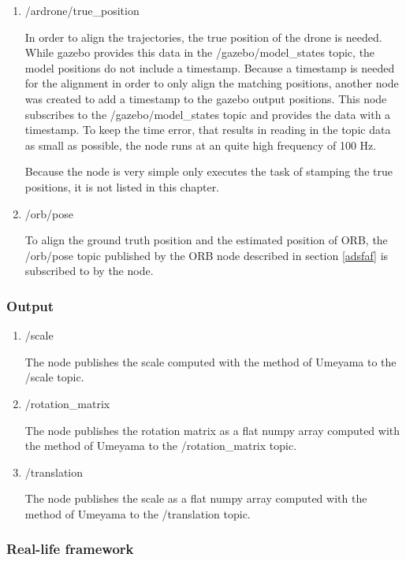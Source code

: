 	\begin{enumerate}
	\item{/ardrone/true\_position}
	
	In order to align the trajectories, the true position of the drone is needed. 
	While gazebo provides this data in the /gazebo/model\_states topic, the model 
	positions do not include a timestamp. Because a timestamp is needed for the alignment 
	in order to only align the matching positions, another node was created to add a timestamp 
	to the gazebo output positions. This node subscribes to the /gazebo/model\_states topic 
	and provides the data with a timestamp. To keep the time error, that results in reading in 
	the topic data as small as possible, 
	the node runs at an quite high frequency of 100 Hz. 
	
	Because the node is very simple only executes the task of stamping the true positions, 
	it is not listed in this chapter. 
	
	\item{/orb/pose}
	
	To align the ground truth position and the estimated position of ORB, the /orb/pose topic published 
	by the ORB node described in section \ref{adsfaf} is subscribed to by the node. 
	
	\end{enumerate}
	
	\subsubsection{Output}
	
	\begin{enumerate}
	\item{/scale}
	
	The node publishes the scale computed with the method of Umeyama to  the /scale topic. 
	
	\item{/rotation\_matrix}
	
	The node publishes the rotation matrix as a flat numpy array computed with the method of Umeyama to  the /rotation\_matrix topic.
	
	\item{/translation}
	
	The node publishes the scale as a flat numpy array computed with the method of Umeyama to  the /translation topic.
	
	\end{enumerate}
	
	\subsubsection{Real-life framework}
	

